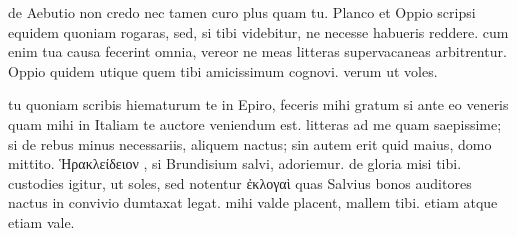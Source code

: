  de Aebutio non credo nec tamen curo plus quam tu. Planco et Oppio scripsi equidem quoniam rogaras, sed, si tibi videbitur, ne necesse habueris reddere. cum enim tua causa fecerint omnia, vereor ne meas litteras supervacaneas arbitrentur. Oppio quidem utique quem tibi amicissimum cognovi. verum ut voles.

 tu quoniam scribis hiematurum te in Epiro, feceris mihi gratum si ante eo veneris quam mihi in Italiam te auctore veniendum est. litteras ad me quam saepissime; si de rebus minus necessariis, aliquem nactus; sin autem erit quid maius, domo mittito. Ἡρακλείδειον , si Brundisium salvi, adoriemur. de gloria misi tibi. custodies igitur, ut soles, sed notentur ἐκλογαὶ quas Salvius bonos auditores nactus in convivio dumtaxat legat. mihi valde placent, mallem tibi. etiam atque etiam vale.
